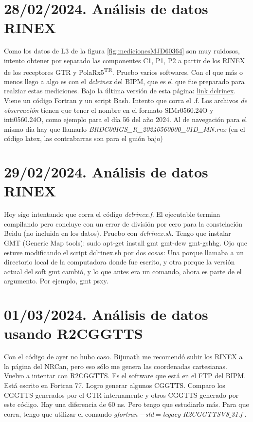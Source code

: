 \documentclass[11pt]{article}
\newcommand{\polar}[0]{PolaRx5\textsuperscript{TR}}
\begin{document}
\section{28/02/2024. Análisis de datos RINEX}

Como los datos de L3 de la figura \ref{fig:medicionesMJD60364} son muy ruidosos, intento obtener por separado las componentes C1, P1, P2 a partir de los RINEX de los receptores GTR y \polar. Pruebo varios softwares. Con el que más o menos llego a algo es con el \textit{dclrinex} del BIPM, que es el que fue preparado para realziar estas mediciones. Bajo la última versión de esta página:  \href{https://webtai.bipm.org/ftp/pub/tai/publication/gnss-calibration/doc-soft/dclrinex.sh_20160322}{link dclrinex}. Viene un código Fortran y un script Bash. Intento que corra el .f. Los archivos \textit{de observación} tienen que tener el nombre en el formato SIMr0560.24O y inti0560.24O, como ejemplo para el día 56 del año 2024. Al de navegación para el mismo día hay que llamarlo \textit{BRDC00IGS\_R\_20240560000\_01D\_MN.rnx} (en el código latex, las contrabarras son para el guión bajo)

\section{29/02/2024. Análisis de datos RINEX}
Hoy sigo intentando que corra el código \textit{dclrinex.f}. El ejecutable termina compilando pero concluye con un error de división por cero para la constelación Beidu (no incluida en los datos). Pruebo con \textit{dclrinex.sh}. Tengo que instalar GMT (Generic Map tools): sudo apt-get install gmt gmt-dcw gmt-gshhg. 
Ojo que estuve modificando el script dclrinex.sh por dos cosas: Una porque llamaba a un directorio local de la computadora donde fue escrito, y otra porque la versión actual del soft gmt cambió, y lo que antes era un comando, ahora es parte de el argumento. Por ejemplo, gmt psxy.

\section{01/03/2024. Análisis de datos usando R2CGGTTS}
Con el código de ayer no hubo caso. Bijunath me recomendó subir los RINEX a la página del NRCan, pero eso sólo me genera las coordenadas cartesianas. Vuelvo a intentar con R2CGGTTS. Es el software que está en el FTP del BIPM. Está escrito en Fortran 77. Logro generar algunos CGGTTS. Comparo los CGGTTS generados por el GTR internamente y otros CGGTTS generado por este código. Hay una diferencia de 60 ns. Pero tengo que estudiarlo más.
Para que corra, tengo que utilizar el comando \textit{gfortran $-$std$=$legacy R2CGGTTSV8$\_$31.f} .
\end{document}
